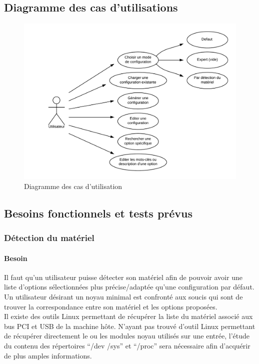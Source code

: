 \documentclass[16pts]{report}
\begin{document}
        \subsection{Diagramme des cas d'utilisations}
        \label{sub:Diagramme des cas d'utilisations}
\begin{figure}[H]
    \includegraphics[scale=0.25]{illustrations/diagramme_cas_utilisation.png}
    \centering
    \caption{Diagramme des cas d'utilisation}
    \label{fig:DCU}
\end{figure}

        \subsection{Besoins fonctionnels et tests prévus}
        \label{sub:Besoins fonctionnels et tests prévus}
\subsubsection{Détection du matériel}
\label{ssub:Détection du matériel}
\paragraph{Besoin}
\label{sssbus:Besoin}
Il faut qu’un utilisateur puisse détecter son matériel afin de pouvoir
avoir une liste d’options sélectionnées plus précise/adaptée qu’une
configuration par défaut. Un utilisateur désirant un noyau minimal est
confronté aux soucis qui sont de trouver la correspondance entre son matériel et
les options proposées.
\\

Il existe des outils Linux permettant de récupérer la liste du matériel associé
aux bus PCI et USB de la machine hôte.  N’ayant pas trouvé d’outil Linux
permettant de récupérer directement le ou les modules noyau utilisés sur une
entrée, l’étude du contenu des répertoires “/dev /sys” et “/proc” sera
nécessaire afin d’acquérir de plus amples informations.
\\
\end{document}
